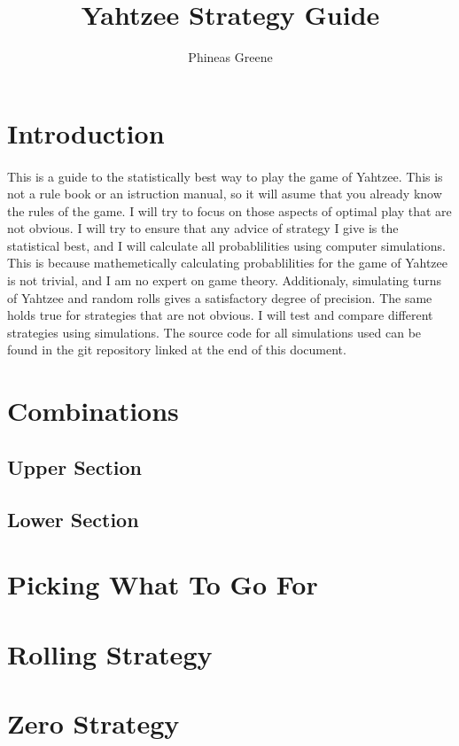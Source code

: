 \documentclass{article}
\title{Yahtzee Strategy Guide}
\author{Phineas Greene}
\begin{document}
\maketitle

\section{Introduction}
\paragraph{}
This is a guide to the statistically best way to play the game of Yahtzee. This is not a rule book or an istruction manual, so it will asume that you already know the rules of the game. I will try to focus on those aspects of optimal play that are not obvious.  I will try to ensure that any advice of strategy I give is the statistical best, and I will calculate all probablilities using computer simulations. This is because mathemetically calculating probablilities for the game of Yahtzee is not trivial, and I am no expert on game theory. Additionaly, simulating turns of Yahtzee and random rolls gives a satisfactory degree of precision. The same holds true for strategies that are not obvious. I will test and compare different strategies using simulations. The source code for all simulations used can be found in the git repository linked at the end of this document.

\section{Combinations}
\subsection{Upper Section}
\subsection{Lower Section}

\section{Picking What To Go For}

\section{Rolling Strategy}

\section{Zero Strategy}
\end{document}
